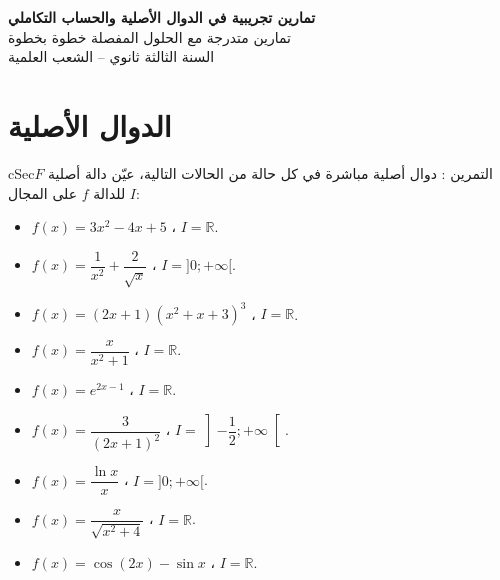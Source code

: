 \documentclass[12pt,a4paper]{article}
\newenvironment{BOX}[2]{\begin{otherlanguage}{english}\begin{arbox}{#1}{#2}}{\end{arbox}\end{otherlanguage}}
\newcounter{exo}
\newenvironment{tamrin}[1]{\stepcounter{exo}\begin{BOX}{cSec}{التمرين \theexo: #1}}{\end{BOX}}
\newenvironment{LTR}{\begin{otherlanguage}{english}}{\end{otherlanguage}}
\newcommand{\R}{\mathbb{R}}
\newenvironment{sq}{\begin{itemize}[leftmargin=2.4em,itemsep=3pt]}{\end{itemize}}
\newcommand{\qa}{\item[(أ)]}\newcommand{\qb}{\item[(ب)]}\newcommand{\qc}{\item[(جـ)]}\newcommand{\qd}{\item[(د)]}\newcommand{\qe}{\item[(هـ)]}
\begin{document}
\begin{LTR}
\begin{tcolorbox}[enhanced,colback=cSec,colframe=cSec,arc=3mm,halign=center,boxrule=0pt,top=12pt,bottom=12pt,before upper={\selectlanguage{arabic}}]
{\color{white}\fontsize{24}{30}\selectfont\bfseries تمارين تجريبية في الدوال الأصلية والحساب التكاملي}\\[8pt]
{\color{white}\large تمارين متدرجة مع الحلول المفصلة خطوة بخطوة}\\[5pt]
{\color{white}\large السنة الثالثة ثانوي -- الشعب العلمية}
\end{tcolorbox}
\end{LTR}
\section{الدوال الأصلية}

\begin{tamrin}{دوال أصلية مباشرة}
في كل حالة من الحالات التالية، عيّن دالة أصلية $F$ للدالة $f$ على المجال $I$:
\begin{sq}
\qa $f(x)=3x^{2}-4x+5$ \quad ، \quad $I=\R$.
\qb $f(x)=\dfrac{1}{x^{2}}+\dfrac{2}{\sqrt{x}}$ \quad ، \quad $I=]0;+\infty[$.
\qc $f(x)=(2x+1)\left(x^{2}+x+3\right)^{3}$ \quad ، \quad $I=\R$.
\qd $f(x)=\dfrac{x}{x^{2}+1}$ \quad ، \quad $I=\R$.
\qe $f(x)=e^{2x-1}$ \quad ، \quad $I=\R$.
\item[(و)] $f(x)=\dfrac{3}{(2x+1)^{2}}$ \quad ، \quad $I=\left]-\dfrac12;+\infty\right[$.
\item[(ز)] $f(x)=\dfrac{\ln x}{x}$ \quad ، \quad $I=]0;+\infty[$.
\item[(ح)] $f(x)=\dfrac{x}{\sqrt{x^{2}+4}}$ \quad ، \quad $I=\R$.
\item[(ط)] $f(x)=\cos(2x)-\sin x$ \quad ، \quad $I=\R$.
\end{sq}
\end{tamrin}
\end{document}
